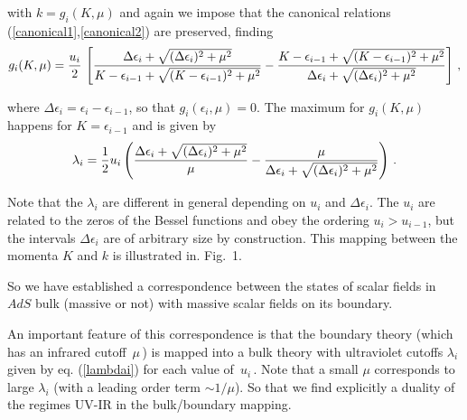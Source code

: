 \documentclass[a4paper,12pt]{article}
\begin{document}
\noindent with $ k = g_i (K,\mu) $ and again we impose that the canonical relations 
(\ref{canonical1},\ref{canonical2}) are preserved, finding 
\begin{equation}
g_i (K,\mu) = {u_i \over 2} \,\left[ {\Delta\epsilon_i 
 +\sqrt{(\Delta\epsilon_i)^2 + \mu^2 } 
		\over K - \epsilon_{i-1} + 
\sqrt{(K - \epsilon_{i-1})^2 + \mu^2}}
- {K - \epsilon_{i-1} + \sqrt{(K - \epsilon_{i-1})^2 + \mu^2}\over 
\Delta\epsilon_i +\sqrt{(\Delta\epsilon_i)^2 + \mu^2 }}\right]\,,
\end{equation}


\noindent where $\Delta\epsilon_i=\epsilon_i-\epsilon_{i-1}$, 
so that $g_i ( \epsilon_i,\mu)=0$. 
The maximum  for $g_{i}(K,\mu)$ happens for $K=\epsilon_{i-1}$ 
and is given by
\begin{equation}
\label{lambdai}
\lambda_i =  \frac 12 u_i
\left(
{\Delta\epsilon_i+\sqrt{(\Delta\epsilon_i)^2+\mu^2}\over \mu}
-{\mu\over\Delta\epsilon_i+\sqrt{(\Delta\epsilon_i)^2+\mu^2}}
\right)\,.
\end{equation}

\noindent  
Note that the $\lambda_i$ are different in general depending on $u_i$
and $\Delta\epsilon_i$. The $u_i$ are related to the zeros of the Bessel
functions and obey the ordering $u_i > u_{i-1}$, but the intervals 
$\Delta\epsilon_i$ are of arbitrary size by construction.
This mapping between the momenta $K$ and $k$ is illustrated in. Fig.~1.

So we have established a correspondence between the states of scalar 
fields in $AdS$ bulk (massive or not) with massive scalar fields on 
its boundary. 

An important feature of this correspondence is that the boundary theory 
(which has an infrared cutoff $\,\mu\,$)
is mapped into a bulk theory with  ultraviolet
cutoffs $\lambda_i$ given by eq. (\ref{lambdai}) for each value of $\,u_i\,$.
Note that a  small $\mu  $  corresponds to  large $ \lambda_i $ (with a leading 
order term $\sim 1/\mu$). So  that we find explicitly a duality of the regimes UV-IR 
in the bulk/boundary mapping.

\end{document}
